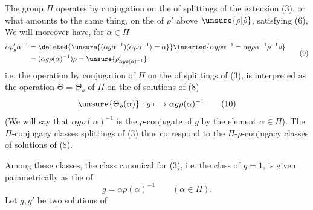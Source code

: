 




The group $\Pi$ operates by conjugation on the  of splittings of the extension (3), or what amounts to the same thing, on the  of $\rho'$ above $\unsure{\rho|\dot\rho}$, satisfying (6),  We will moreover have, for $\alpha\in\Pi$
\[
\begin{aligned}
\alpha\rho'_g\alpha^{-1}
&=\deleted{\unsure{(\alpha g\alpha^{-1})(\alpha\rho\alpha^{-1})=\alpha}}\inserted{\alpha g\rho\alpha^{-1}=\alpha g\rho\alpha^{-1}\rho^{-1}\rho}\\
&=(\alpha g\rho(\alpha)^{-1})\rho
=\unsure{\rho'_{\alpha g\rho(\alpha)^{-1}}}
\end{aligned}\tag{9}
\]
i.e. the operation by conjugation of $\Pi$ on the  of splittings of (3), is interpreted as the operation $\Theta=\Theta_\rho$ of $\Pi$ on the  of solutions of (8) 
\[
\unsure{\Theta_\rho(\alpha)}:g\longmapsto\alpha g\rho(\alpha)^{-1} \tag{10}
\]
(We will say that $\alpha g\rho(\alpha)^{-1}$ is the $\rho$-conjugate of $g$ by the element $\alpha\in\Pi$). The $\Pi$-conjugacy classes  splittings of (3) thus correspond to the $\Pi$-$\rho$-conjugacy classes of solutions of (8).

Among these classes, the  class  canonical for (3), i.e. the class of $g=1$, is given parametrically  as the  of
\[
g=\alpha\rho(\alpha)^{-1}\qquad(\alpha\in\Pi). \tag{11}
\]
Let $g,g'$ be two  solutions of


